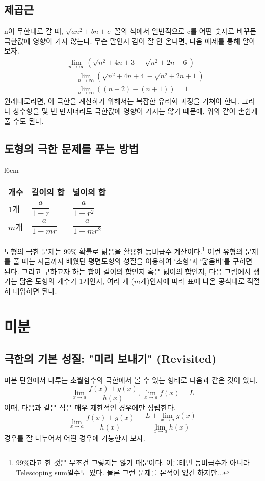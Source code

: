 \documentclass{scrartcl}
\begin{document}
\subsection{제곱근}
n이 무한대로 갈 때, \(\sqrt{an^2+bn+c}\) 꼴의 식에서 일반적으로 c를 어떤 숫자로 바꾸든 극한값에 영향이 가지 않는다. 무슨 말인지 감이 잘 안 온다면, 다음 예제를 통해 알아보자.
\begin{align*}
&\lim_{n \to \infty} \left(\sqrt{n^2+4n+3}-\sqrt{n^2+2n-6}\right) \\
&= \lim_{n \to \infty} \left(\sqrt{n^2+4n+4}-\sqrt{n^2+2n+1}\right) \\
&= \lim_{n \to \infty} ((n+2)-(n+1)) = 1
\end{align*}
원래대로라면, 이 극한을 계산하기 위해서는 복잡한 유리화 과정을 거쳐야 한다. 그러나 상수항을 몇 번 만지더라도 극한값에 영향이 가지는 않기 때문에, 위와 같이 손쉽게 풀 수도 된다.
\subsection{도형의 극한 문제를 푸는 방법}
\begin{wrapfigure}[5]{l}{6cm}
\vspace{-10pt}
\bgroup
\def\arraystretch{1.5}
\begin{tabular}{|lll|}
\hline
개수     & 길이의 합               & 넓이의 합                \\ \hline
1개     & \(\dfrac{a}{1-r}\)  & \(\dfrac{a}{1-r^2}\)  \\
\(m\)개 & \(\dfrac{a}{1-mr}\) & \(\dfrac{a}{1-mr^2}\) \\ \hline
\end{tabular}
\egroup
\end{wrapfigure}
도형의 극한 문제는 99\% 확률로 닮음을 활용한 등비급수 계산이다.\footnote{99\%라고 한 것은 무조건 그렇지는 않기 때문이다. 이를테면 등비급수가 아니라 Telescoping sum일수도 있다. 물론 그런 문제를 본적이 없긴 하지만...} 이런 유형의 문제를 풀 때는  지금까지 배웠던 평면도형의 성질을 이용하여 `초항'과 `닮음비'를 구하면 된다. 그리고 구하고자 하는 합이 길이의 합인지 혹은 넓이의 합인지, 다음 그림에서 생기는 닮은 도형의 개수가 1개인지, 여러 개 (\(m\)개)인지에 따라 표에 나온 공식대로 적절히 대입하면 된다.

\section{미분}
\subsection{극한의 기본 성질: "미리 보내기" (Revisited)}
미분 단원에서 다루는 초월함수의 극한에서 볼 수 있는 형태로 다음과 같은 것이 있다.
\[
\lim_{x\to a}\frac{f(x)+g(x)}{h(x)},\,\lim_{x\to a}f(x)=L
\]
이때, 다음과 같은 식은 매우 제한적인 경우에만 성립한다.
\[
\lim_{x\to a}\frac{f(x)+g(x)}{h(x)}=\frac{L+\lim_{x\to a}g(x)}{\lim_{x\to a}h(x)}
\]
경우를 잘 나누어서 어떤 경우에 가능한지 보자.
\end{document}
